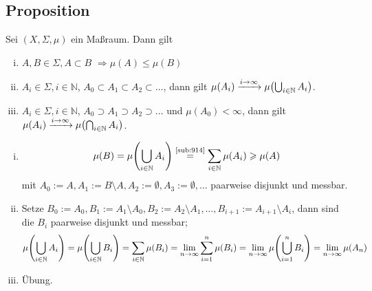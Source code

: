 \subsection[Proposition: Eigenschaften von Maßen]{Proposition} %
\label{sub:915}
Sei $(X,\Sigma, \mu)$ ein Maßraum. Dann gilt
\begin{enumerate}[(i)]
	\item $A,B \in \Sigma, A \subset B$ $\Longrightarrow \mu (A) \le \mu(B)$
	\item $A_i \in \Sigma, i \in \mathds{N}$, $A_0 \subset A_1 \subset A_2 \subset \ldots $, dann gilt $\mu (A_i) \xrightarrow{i \to \infty} \mu \enbrace*{\bigcup_{i \in \mathds{N}} A_i} $.
	\item $A_i \in \Sigma, i\in \mathds{N}$, $A_0 \supset A_1 \supset A_2 \supset \ldots $ und $\mu(A_0) < \infty$, dann gilt $\mu (A_i) \xrightarrow{i \to \infty} \mu \enbrace*{\bigcap_{i \in \mathds{N}} A_i} $.
\end{enumerate}
\begin{enumerate}[(i)]
	\item \[
		\mu (B) =\mu \enbrace*{\bigcup_{i \in \mathds{N}} A_i}  \stackrel{\text{\ref{sub:914}}}{=} \sum_{i \in \mathds{N}} \mu(A_i)  \ge \mu (A)
	\]
	mit $A_0 := A, A_1 := B \setminus A, A_2 := \emptyset, A_3 := \emptyset, \ldots $ paarweise disjunkt und messbar.
	\item Setze $B_0 := A_0, B_1 := A_1 \setminus A_0, B_2 := A_2 \setminus A_1, \ldots , B_{i+1} := A_{i+1} \setminus A_i$, dann sind die $B_i$ paarweise disjunkt und 
	messbar;
	\[
		\mu \enbrace*{\bigcup_{i \in \mathds{N}} A_i} = \mu \enbrace*{\bigcup_{i \in \mathds{N}} B_i} = \sum_{i \in \mathds{N}} \mu(B_i) = \lim_{ n \to \infty} 
		\sum_{i=1}^{n} \mu(B_i) = \lim_{ n \to \infty} \mu \enbrace*{\bigcup_{i=1}^n B_i} = \lim_{ n \to \infty} \mu(A_n) 
	\]
	\item Übung. \bewende
\end{enumerate}

